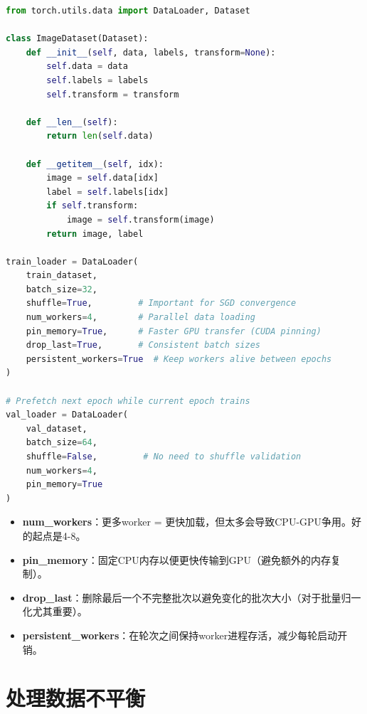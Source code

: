 \begin{code}
    \label{code:dataloader}
\begin{lstlisting}[language=python]
from torch.utils.data import DataLoader, Dataset

class ImageDataset(Dataset):
    def __init__(self, data, labels, transform=None):
        self.data = data
        self.labels = labels
        self.transform = transform
    
    def __len__(self):
        return len(self.data)
    
    def __getitem__(self, idx):
        image = self.data[idx]
        label = self.labels[idx]
        if self.transform:
            image = self.transform(image)
        return image, label

train_loader = DataLoader(
    train_dataset,
    batch_size=32,
    shuffle=True,         # Important for SGD convergence
    num_workers=4,        # Parallel data loading
    pin_memory=True,      # Faster GPU transfer (CUDA pinning)
    drop_last=True,       # Consistent batch sizes
    persistent_workers=True  # Keep workers alive between epochs
)

# Prefetch next epoch while current epoch trains
val_loader = DataLoader(
    val_dataset,
    batch_size=64,
    shuffle=False,         # No need to shuffle validation
    num_workers=4,
    pin_memory=True
)
\end{lstlisting}
\end{code}

\begin{properties}[DataLoader优化]
\begin{itemize}
    \item \textbf{num\_workers}：更多worker = 更快加载，但太多会导致CPU-GPU争用。好的起点是4-8。
    \item \textbf{pin\_memory}：固定CPU内存以便更快传输到GPU（避免额外的内存复制）。
    \item \textbf{drop\_last}：删除最后一个不完整批次以避免变化的批次大小（对于批量归一化尤其重要）。
    \item \textbf{persistent\_workers}：在轮次之间保持worker进程存活，减少每轮启动开销。
\end{itemize}
\end{properties}

\section{处理数据不平衡}

